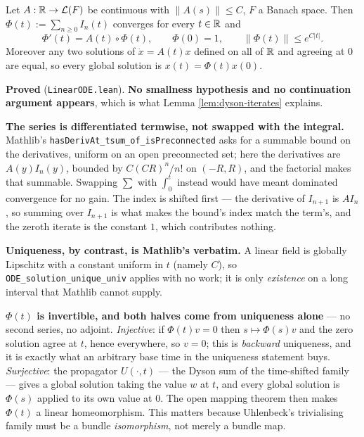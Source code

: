 \begin{theorem}
  \label{thm:linear-ode}
  \leanok
  Let $A : \mathbb{R} \to \mathcal{L}(F)$ be continuous with $\|A(s)\| \le C$, $F$ a Banach space.
  Then $\Phi(t) := \sum_{n\ge 0} I_n(t)$ converges for every $t \in \mathbb{R}$ and
  \[
    \Phi'(t) = A(t)\circ\Phi(t), \qquad \Phi(0) = 1, \qquad \|\Phi(t)\| \le e^{C|t|} .
  \]
  Moreover any two solutions of $\dot x = A(t)x$ defined on all of $\mathbb{R}$ and agreeing at
  $0$ are equal, so every global solution is $x(t) = \Phi(t)x(0)$.

  \textbf{Proved} (\texttt{LinearODE.lean}). \textbf{No smallness hypothesis and no
  continuation argument appears}, which is what Lemma \ref{lem:dyson-iterates} explains.

  \textbf{The series is differentiated termwise, not swapped with the integral.} Mathlib's
  \texttt{hasDerivAt\_tsum\_of\_isPreconnected} asks for a summable bound on the
  derivatives, uniform on an open preconnected set; here the derivatives are
  $A(y)I_n(y)$, bounded by $C(CR)^n/n!$ on $(-R,R)$, and the factorial makes that
  summable. Swapping $\sum$ with $\int_0^t$ instead would have meant dominated
  convergence for no gain. The index is shifted first --- the derivative of $I_{n+1}$ is
  $A I_n$, so summing over $I_{n+1}$ is what makes the bound's index match the term's,
  and the zeroth iterate is the constant $1$, which contributes nothing.

  \textbf{Uniqueness, by contrast, is Mathlib's verbatim.} A linear field is globally
  Lipschitz with a constant uniform in $t$ (namely $C$), so
  \texttt{ODE\_solution\_unique\_univ} applies with no work; it is only \emph{existence}
  on a long interval that Mathlib cannot supply.

  \textbf{$\Phi(t)$ is invertible, and both halves come from uniqueness alone} --- no second
  series, no adjoint. \emph{Injective}: if $\Phi(t)v = 0$ then $s \mapsto \Phi(s)v$ and the
  zero solution agree at $t$, hence everywhere, so $v = 0$; this is \emph{backward}
  uniqueness, and it is exactly what an arbitrary base time in the uniqueness statement buys.
  \emph{Surjective}: the propagator $U(\cdot,t)$ --- the Dyson sum of the time-shifted family
  --- gives a global solution taking the value $w$ at $t$, and every global solution is
  $\Phi(s)$ applied to its own value at $0$. The open mapping theorem then makes $\Phi(t)$ a
  linear homeomorphism. This matters because Uhlenbeck's trivialising family must be a bundle
  \emph{isomorphism}, not merely a bundle map.


\end{theorem}
